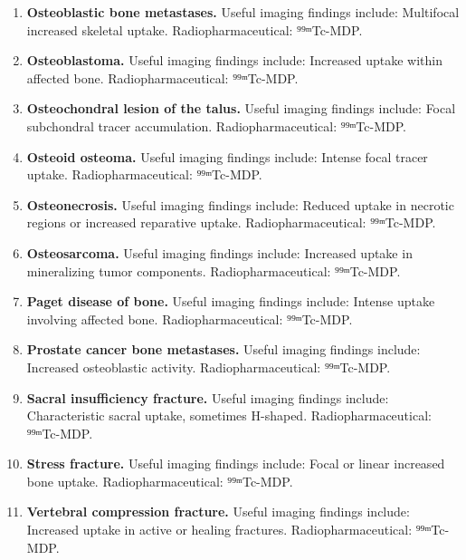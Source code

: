 \begin{enumerate}[leftmargin=*,itemsep=0.45em,topsep=0.4em]
\item \textbf{Osteoblastic bone metastases.} Useful imaging findings include: Multifocal increased skeletal uptake. Radiopharmaceutical: ⁹⁹ᵐTc-MDP.
\item \textbf{Osteoblastoma.} Useful imaging findings include: Increased uptake within affected bone. Radiopharmaceutical: ⁹⁹ᵐTc-MDP.
\item \textbf{Osteochondral lesion of the talus.} Useful imaging findings include: Focal subchondral tracer accumulation. Radiopharmaceutical: ⁹⁹ᵐTc-MDP.
\item \textbf{Osteoid osteoma.} Useful imaging findings include: Intense focal tracer uptake. Radiopharmaceutical: ⁹⁹ᵐTc-MDP.
\item \textbf{Osteonecrosis.} Useful imaging findings include: Reduced uptake in necrotic regions or increased reparative uptake. Radiopharmaceutical: ⁹⁹ᵐTc-MDP.
\item \textbf{Osteosarcoma.} Useful imaging findings include: Increased uptake in mineralizing tumor components. Radiopharmaceutical: ⁹⁹ᵐTc-MDP.
\item \textbf{Paget disease of bone.} Useful imaging findings include: Intense uptake involving affected bone. Radiopharmaceutical: ⁹⁹ᵐTc-MDP.
\item \textbf{Prostate cancer bone metastases.} Useful imaging findings include: Increased osteoblastic activity. Radiopharmaceutical: ⁹⁹ᵐTc-MDP.
\item \textbf{Sacral insufficiency fracture.} Useful imaging findings include: Characteristic sacral uptake, sometimes H-shaped. Radiopharmaceutical: ⁹⁹ᵐTc-MDP.
\item \textbf{Stress fracture.} Useful imaging findings include: Focal or linear increased bone uptake. Radiopharmaceutical: ⁹⁹ᵐTc-MDP.
\item \textbf{Vertebral compression fracture.} Useful imaging findings include: Increased uptake in active or healing fractures. Radiopharmaceutical: ⁹⁹ᵐTc-MDP.
\end{enumerate}


